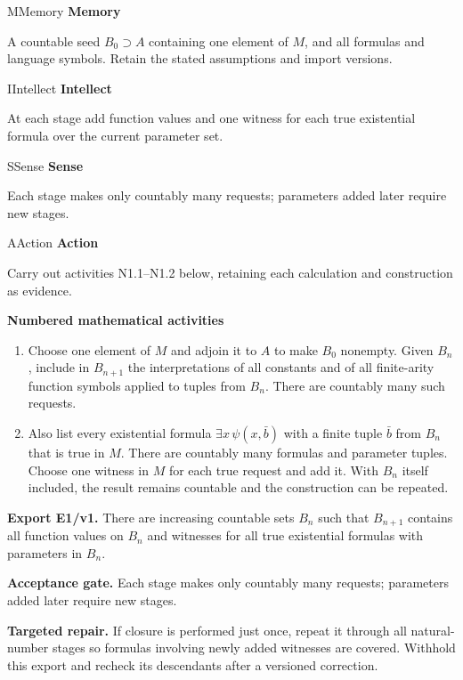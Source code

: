 \documentclass[preprint,12pt,aps,pra,showkeys,amsmath,amssymb,superscriptaddress,floatfix]{revtex4-2}
\theoremstyle{definition}
\theoremstyle{remark}
\newcommand{\mmfaculty}[3]{%
 \begin{mmfacultybox}{#1}{#2}
 {\sffamily\bfseries\color{MMBlue}#2}\par\smallskip #3
 \end{mmfacultybox}}
\newcommand{\field}[2]{\par\smallskip\noindent\textbf{#1.} #2\par}
\begin{document}
\mmfaculty{M}{Memory}{A countable seed \(B_0\supset A\) containing one element of \(M\), and
all formulas and language symbols. Retain the stated assumptions and
import versions.}

\mmfaculty{I}{Intellect}{At each stage add function values and one witness for each true
existential formula over the current parameter set.}

\mmfaculty{S}{Sense}{Each stage makes only countably many requests; parameters added later
require new stages.}

\mmfaculty{A}{Action}{Carry out activities N1.1--N1.2 below, retaining each calculation and
construction as evidence.}

\smallskip\noindent\textbf{Numbered mathematical activities}

\begin{enumerate}[label=N1.\arabic*,leftmargin=3.4em]

\item Choose one element of \(M\) and adjoin it to \(A\) to make \(B_0\)
nonempty. Given \(B_n\), include in \(B_{n+1}\) the interpretations of
all constants and of all finite-arity function symbols applied to tuples
from \(B_n\). There are countably many such requests.

\item Also list every existential formula \(\exists x\,\psi(x,\bar b)\) with a
finite tuple \(\bar b\) from \(B_n\) that is true in \(M\). There are
countably many formulas and parameter tuples. Choose one witness in
\(M\) for each true request and add it. With \(B_n\) itself included,
the result remains countable and the construction can be repeated.

\end{enumerate}

\field{Export E1/v1}{There are increasing countable sets \(B_n\) such that \(B_{n+1}\)
contains all function values on \(B_n\) and witnesses for all true
existential formulas with parameters in \(B_n\).}

\field{Acceptance gate}{Each stage makes only countably many requests; parameters added later
require new stages.}

\field{Targeted repair}{If closure is performed just once, repeat it through all natural-number
stages so formulas involving newly added witnesses are covered. Withhold
this export and recheck its descendants after a versioned correction.}

\endgroup

\clearpage
\end{document}
